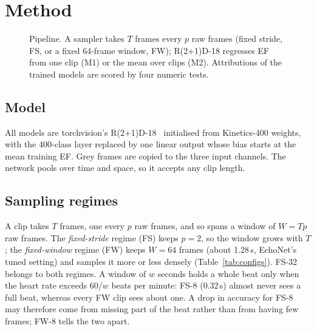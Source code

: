 \documentclass[conference]{IEEEtran}
\begin{document}
\section{Method}
\begin{figure}[t]
\centering
{}
\caption{Pipeline. A sampler takes $T$ frames every $p$ raw frames (fixed stride, FS, or a fixed
64-frame window, FW); R(2+1)D-18 regresses EF from one clip (M1) or the mean over clips (M2).
Attributions of the trained models are scored by four numeric tests.}
\label{fig:pipeline}
\end{figure}

\subsection{Model}
All models are torchvision's R(2+1)D-18~\cite{tran2018closer,torchvision_r2plus1d} initialised
from Kinetics-400 weights, with the 400-class layer replaced by one linear output whose bias
starts at the mean training EF. Grey frames are copied to the three input channels. The network
pools over time and space, so it accepts any clip length.

\subsection{Sampling regimes}
A clip takes $T$ frames, one every $p$ raw frames, and so spans a window of $W = T p$ raw
frames. The \emph{fixed-stride} regime (FS) keeps $p = 2$, so the window grows with $T$; the
\emph{fixed-window} regime (FW) keeps $W = 64$ frames (about 1.28\,s, EchoNet's tuned setting)
and samples it more or less densely (Table~\ref{tab:configs}). FS-32 belongs to both regimes. A
window of $w$ seconds holds a whole beat only when the heart rate exceeds $60/w$ beats per
minute: FS-8 (0.32\,s) almost never sees a full beat, whereas every FW clip sees about one. A
drop in accuracy for FS-8 may therefore come from missing part of the beat rather than from
having few frames; FW-8 tells the two apart.
\end{document}

